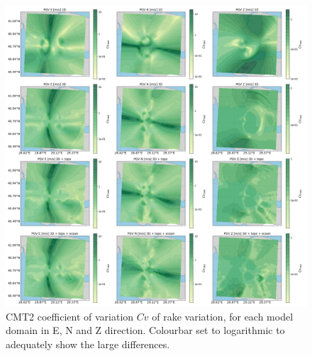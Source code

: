 \documentclass[../Text/00main.tex]{subfiles}
\begin{document}
\begin{figure}
    \centering
    \includegraphics[width=1\linewidth,trim = 2cm 5cm 1cm 5cm, clip]{images_results/rake_variation_sigma_sc3.png}
    \caption{CMT2 coefficient of variation $Cv$ of rake variation, for each model domain in E, N and Z direction. Colourbar set to logarithmic to adequately show the large differences.}
    \label{fig:cmt2sigm}
\end{figure}
\end{document}
